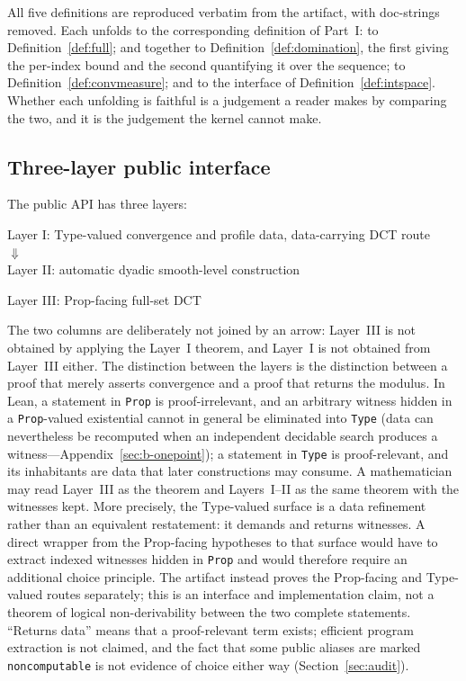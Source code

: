 \documentclass[11pt]{article}
\theoremstyle{definition}
\theoremstyle{remark}
\begin{document}
\noindent All five definitions are reproduced verbatim from the artifact, with doc-strings
removed. Each unfolds to the corresponding definition of Part~I:
 to Definition~\ref{def:full};  and
 together to Definition~\ref{def:domination}, the first
giving the per-index bound and the second quantifying it over the sequence;
 to Definition~\ref{def:convmeasure}; and
 to the interface of Definition~\ref{def:intspace}. Whether each unfolding is faithful is a judgement a
reader makes by comparing the two, and it is the judgement the kernel cannot make.

\subsection{Three-layer public interface}
\label{sec:layers}
The public API has three layers:
\begin{center}
\small
\begin{minipage}[t]{0.62\textwidth}
\centering
Layer I: Type-valued convergence and profile data, data-carrying DCT route\\[0.2em]
$\Downarrow$\\[0.2em]
Layer II: automatic dyadic smooth-level construction
\end{minipage}\hfill
\begin{minipage}[t]{0.34\textwidth}
\centering
Layer III: Prop-facing full-set DCT
\end{minipage}
\end{center}
The two columns are deliberately not joined by an arrow: Layer~III is not obtained by applying the Layer~I theorem, and Layer~I is not obtained from Layer~III either.  The distinction between the layers is the distinction between a proof that merely asserts convergence and a proof that returns the modulus.  In Lean, a statement in \texttt{Prop} is proof-irrelevant, and an arbitrary witness hidden in a \texttt{Prop}-valued existential cannot in general be eliminated into \texttt{Type} (data can nevertheless be recomputed when an independent decidable search produces a witness---Appendix~\ref{sec:b-onepoint}); a statement in \texttt{Type} is proof-relevant, and its inhabitants are data that later constructions may consume.  A mathematician may read Layer~III as the theorem and Layers~I--II as the same theorem with the witnesses kept.  More precisely, the Type-valued surface is a data refinement rather than an equivalent restatement: it demands and returns witnesses.  A direct wrapper from the Prop-facing hypotheses to that surface would have to extract indexed witnesses hidden in \texttt{Prop} and would therefore require an additional choice principle.  The artifact instead proves the Prop-facing and Type-valued routes separately; this is an interface and implementation claim, not a theorem of logical non-derivability between the two complete statements.  ``Returns data'' means that a proof-relevant term exists; efficient program extraction is not claimed, and the fact that some public aliases are marked \texttt{noncomputable} is not evidence of choice either way (Section~\ref{sec:audit}).
\end{document}
